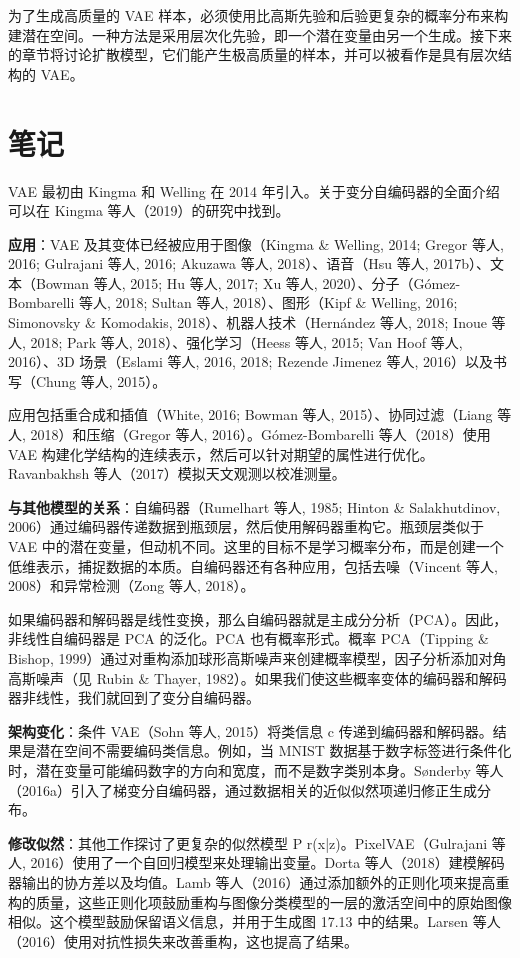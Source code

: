 \documentclass[lang=cn,newtx,10pt,scheme=chinese]{elegantbook}
\begin{document}
为了生成高质量的 VAE 样本，必须使用比高斯先验和后验更复杂的概率分布来构建潜在空间。一种方法是采用层次化先验，即一个潜在变量由另一个生成。接下来的章节将讨论扩散模型，它们能产生极高质量的样本，并可以被看作是具有层次结构的 VAE。


\section{笔记}
VAE 最初由 Kingma 和 Welling 在 2014 年引入。关于变分自编码器的全面介绍可以在 Kingma 等人（2019）的研究中找到。

\textbf{应用}：VAE 及其变体已经被应用于图像（Kingma \& Welling, 2014; Gregor 等人, 2016; Gulrajani 等人, 2016; Akuzawa 等人, 2018）、语音（Hsu 等人, 2017b）、文本（Bowman 等人, 2015; Hu 等人, 2017; Xu 等人, 2020）、分子（Gómez-Bombarelli 等人, 2018; Sultan 等人, 2018）、图形（Kipf \& Welling, 2016; Simonovsky \& Komodakis, 2018）、机器人技术（Hernández 等人, 2018; Inoue 等人, 2018; Park 等人, 2018）、强化学习（Heess 等人, 2015; Van Hoof 等人, 2016）、3D 场景（Eslami 等人, 2016, 2018; Rezende Jimenez 等人, 2016）以及书写（Chung 等人, 2015）。

应用包括重合成和插值（White, 2016; Bowman 等人, 2015）、协同过滤（Liang 等人, 2018）和压缩（Gregor 等人, 2016）。Gómez-Bombarelli 等人（2018）使用 VAE 构建化学结构的连续表示，然后可以针对期望的属性进行优化。Ravanbakhsh 等人（2017）模拟天文观测以校准测量。

\textbf{与其他模型的关系}：自编码器（Rumelhart 等人, 1985; Hinton \& Salakhutdinov, 2006）通过编码器传递数据到瓶颈层，然后使用解码器重构它。瓶颈层类似于 VAE 中的潜在变量，但动机不同。这里的目标不是学习概率分布，而是创建一个低维表示，捕捉数据的本质。自编码器还有各种应用，包括去噪（Vincent 等人, 2008）和异常检测（Zong 等人, 2018）。

如果编码器和解码器是线性变换，那么自编码器就是主成分分析（PCA）。因此，非线性自编码器是 PCA 的泛化。PCA 也有概率形式。概率 PCA（Tipping \& Bishop, 1999）通过对重构添加球形高斯噪声来创建概率模型，因子分析添加对角高斯噪声（见 Rubin \& Thayer, 1982）。如果我们使这些概率变体的编码器和解码器非线性，我们就回到了变分自编码器。

\textbf{架构变化}：条件 VAE（Sohn 等人, 2015）将类信息 c 传递到编码器和解码器。结果是潜在空间不需要编码类信息。例如，当 MNIST 数据基于数字标签进行条件化时，潜在变量可能编码数字的方向和宽度，而不是数字类别本身。Sønderby 等人（2016a）引入了梯变分自编码器，通过数据相关的近似似然项递归修正生成分布。

\textbf{修改似然}：其他工作探讨了更复杂的似然模型 P r(x|z)。PixelVAE（Gulrajani 等人, 2016）使用了一个自回归模型来处理输出变量。Dorta 等人（2018）建模解码器输出的协方差以及均值。Lamb 等人（2016）通过添加额外的正则化项来提高重构的质量，这些正则化项鼓励重构与图像分类模型的一层的激活空间中的原始图像相似。这个模型鼓励保留语义信息，并用于生成图 17.13 中的结果。Larsen 等人（2016）使用对抗性损失来改善重构，这也提高了结果。
\end{document}
